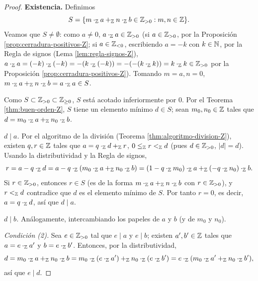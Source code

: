 \documentclass[12pt,a4paper]{book}
\begin{document}
    \begin{proof}
        \textbf{Existencia.} Definimos
        \begin{equation*}
            S = \{m\cdot_{\mathbb{Z}}a+_{\mathbb{Z}}n\cdot_{\mathbb{Z}}b \in\mathbb{Z}_{>0} : m,n\in\mathbb{Z}\}.
        \end{equation*}
        Veamos que $S\neq\emptyset$: como $a\neq0$, $a\cdot_{\mathbb{Z}}a\in\mathbb{Z}_{>0}$ (si $a\in\mathbb{Z}_{>0}$, por la Proposición \ref{prop:cerradura-positivos-Z}; si $a\in\mathbb{Z}_{<0}$, escribiendo $a=-k$ con $k\in\mathbb{N}$, por la Regla de signos (Lema \ref{lem:regla-signos-Z}), $a\cdot_{\mathbb{Z}}a=(-k)\cdot_{\mathbb{Z}}(-k)=-(k\cdot_{\mathbb{Z}}(-k))=-(-(k\cdot_{\mathbb{Z}}k))=k\cdot_{\mathbb{Z}}k\in\mathbb{Z}_{>0}$ por la Proposición \ref{prop:cerradura-positivos-Z}). Tomando $m=a,n=0$, $m\cdot_{\mathbb{Z}}a+_{\mathbb{Z}}n\cdot_{\mathbb{Z}}b=a\cdot_{\mathbb{Z}}a\in S$.

        Como $S\subset\mathbb{Z}_{>0}\subset\mathbb{Z}_{\ge0}$, $S$ está acotado inferiormente por $0$. Por el Teorema \ref{thm:buen-orden-Z}, $S$ tiene un elemento mínimo $d\in S$; sean $m_{0},n_{0}\in\mathbb{Z}$ tales que $d=m_{0}\cdot_{\mathbb{Z}}a+_{\mathbb{Z}}n_{0}\cdot_{\mathbb{Z}}b$.

        \emph{$d\mid a$.} Por el algoritmo de la división (Teorema \ref{thm:algoritmo-division-Z}), existen $q,r\in\mathbb{Z}$ tales que $a=q\cdot_{\mathbb{Z}}d+_{\mathbb{Z}}r$, $0\le_{\mathbb{Z}}r<_{\mathbb{Z}}d$ (pues $d\in\mathbb{Z}_{>0}$, $|d|=d$). Usando la distributividad y la Regla de signos,
        \begin{equation*}
            r = a-q\cdot_{\mathbb{Z}}d = a-q\cdot_{\mathbb{Z}}(m_{0}\cdot_{\mathbb{Z}}a+_{\mathbb{Z}}n_{0}\cdot_{\mathbb{Z}}b) = (1-q\cdot_{\mathbb{Z}}m_{0})\cdot_{\mathbb{Z}}a+_{\mathbb{Z}}(-q\cdot_{\mathbb{Z}}n_{0})\cdot_{\mathbb{Z}}b.
        \end{equation*}
        Si $r\in\mathbb{Z}_{>0}$, entonces $r\in S$ (es de la forma $m\cdot_{\mathbb{Z}}a+_{\mathbb{Z}}n\cdot_{\mathbb{Z}}b$ con $r\in\mathbb{Z}_{>0}$), y $r<_{\mathbb{Z}}d$ contradice que $d$ es el elemento mínimo de $S$. Por tanto $r=0$, es decir, $a=q\cdot_{\mathbb{Z}}d$, así que $d\mid a$.

        \emph{$d\mid b$.} Análogamente, intercambiando los papeles de $a$ y $b$ (y de $m_{0}$ y $n_{0}$).

        \emph{Condición (2).} Sea $e\in\mathbb{Z}_{>0}$ tal que $e\mid a$ y $e\mid b$; existen $a',b'\in\mathbb{Z}$ tales que $a=e\cdot_{\mathbb{Z}}a'$ y $b=e\cdot_{\mathbb{Z}}b'$. Entonces, por la distributividad,
        \begin{equation*}
            d = m_{0}\cdot_{\mathbb{Z}}a+_{\mathbb{Z}}n_{0}\cdot_{\mathbb{Z}}b = m_{0}\cdot_{\mathbb{Z}}(e\cdot_{\mathbb{Z}}a')+_{\mathbb{Z}}n_{0}\cdot_{\mathbb{Z}}(e\cdot_{\mathbb{Z}}b') = e\cdot_{\mathbb{Z}}(m_{0}\cdot_{\mathbb{Z}}a'+_{\mathbb{Z}}n_{0}\cdot_{\mathbb{Z}}b'),
        \end{equation*}
        así que $e\mid d$.


\end{proof}
\end{document}
